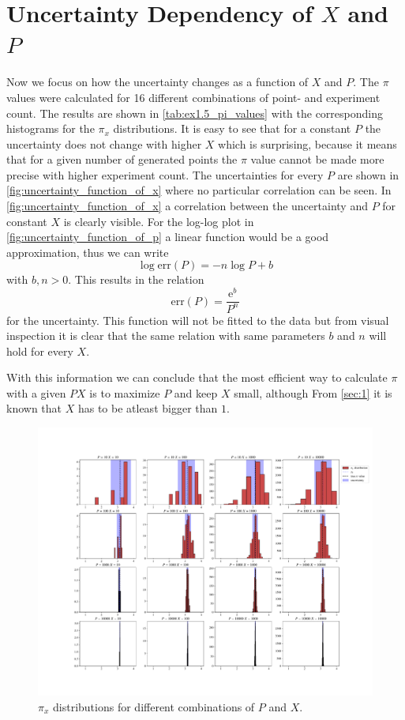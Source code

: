\section{Uncertainty Dependency of $X$ and $P$}\label{sec:3}
Now we focus on how the uncertainty changes as a function of $X$ and $P$.
The $\pi$ values were calculated for 16 different combinations of point- and
experiment count. The results are shown in \cref{tab:ex1.5_pi_values} with
the corresponding histograms for the $\pi_x$ distributions.
It is easy to see that for a constant $P$ the uncertainty does not
change with higher $X$ which is surprising, because it means that for a
given number of generated points the $\pi$ value cannot be made
more precise with higher experiment count. The uncertainties for every
$P$ are shown in \cref{fig:uncertainty_function_of_x} where no particular 
correlation can be seen. In \cref{fig:uncertainty_function_of_x}
a correlation between the uncertainty and $P$ for constant $X$
is clearly visible. For the log-log plot in \cref{fig:uncertainty_function_of_p} a linear
function would be a good approximation, thus we can write
$$ \log \text{err}(P) = -n\log P + b$$
with $b, n > 0$. This results in the relation
$$\text{err}(P) = \frac{\mathrm{e}^b}{P^n}$$
for the uncertainty. This function will not be fitted to the data but from visual
inspection it is clear that the same relation with same parameters $b$ and $n$
will hold for every $X$. \par
With this information we can conclude that the most efficient way to calculate
$\pi$ with a given $PX$ is to maximize $P$ and keep $X$ small, although From
\cref{sec:1} it is known that $X$ has to be atleast bigger than $1$.
%

%
\begin{figure}[htbp]
	\centering
	\includegraphics[width=1\linewidth]{figs/ex1.5_px_combinations.pdf}
	\caption{$\pi_x$ distributions for different combinations of $P$ and $X$.}
	\label{fig:px_combinations}
\end{figure}
